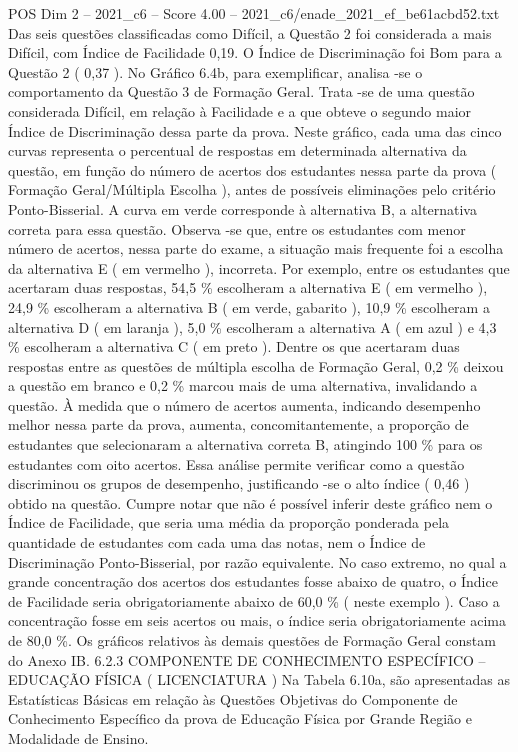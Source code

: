 \begin{textsample}{POS Dim 2 – 2021\_c6 – Score 4.00 – 2021\_c6/enade\_2021\_ef\_be61acbd52.txt}
Das seis questões classificadas como Difícil, a Questão 2 foi considerada a mais Difícil, com Índice de Facilidade 0,19.
O Índice de Discriminação foi Bom para a Questão 2 ( 0,37 ).
No Gráfico 6.4b, para exemplificar, analisa -se o comportamento da Questão 3 de Formação Geral.
Trata -se de uma questão considerada Difícil, em relação à Facilidade e a que obteve o segundo maior Índice de Discriminação dessa parte da prova.
Neste gráfico, cada uma das cinco curvas representa o percentual de respostas em determinada alternativa da questão, em função do número de acertos dos estudantes nessa parte da prova ( Formação Geral/Múltipla Escolha ), antes de possíveis eliminações pelo critério Ponto-Bisserial.
A curva em verde corresponde à alternativa B, a alternativa correta para essa questão.
Observa -se que, entre os estudantes com menor número de acertos, nessa parte do exame, a situação mais frequente foi a escolha da alternativa E ( em vermelho ), incorreta.
Por exemplo, entre os estudantes que acertaram duas respostas, 54,5 \% escolheram a alternativa E ( em vermelho ), 24,9 \% escolheram a alternativa B ( em verde, gabarito ), 10,9 \% escolheram a alternativa D ( em laranja ), 5,0 \% escolheram a alternativa A ( em azul ) e 4,3 \% escolheram a alternativa C ( em preto ).
Dentre os que acertaram duas respostas entre as questões de múltipla escolha de Formação Geral, 0,2 \% deixou a questão em branco e 0,2 \% marcou mais de uma alternativa, invalidando a questão.
À medida que o número de acertos aumenta, indicando desempenho melhor nessa parte da prova, aumenta, concomitantemente, a proporção de estudantes que selecionaram a alternativa correta B, atingindo 100 \% para os estudantes com oito acertos.
Essa análise permite verificar como a questão discriminou os grupos de desempenho, justificando -se o alto índice ( 0,46 ) obtido na questão.
Cumpre notar que não é possível inferir deste gráfico nem o Índice de Facilidade, que seria uma média da proporção ponderada pela quantidade de estudantes com cada uma das notas, nem o Índice de Discriminação Ponto-Bisserial, por razão equivalente.
No caso extremo, no qual a grande concentração dos acertos dos estudantes fosse abaixo de quatro, o Índice de Facilidade seria obrigatoriamente abaixo de 60,0 \% ( neste exemplo ).
Caso a concentração fosse em seis acertos ou mais, o índice seria obrigatoriamente acima de 80,0 \%.
Os gráficos relativos às demais questões de Formação Geral constam do Anexo IB. 6.2.3 COMPONENTE DE CONHECIMENTO ESPECÍFICO – EDUCAÇÃO FÍSICA ( LICENCIATURA ) Na Tabela 6.10a, são apresentadas as Estatísticas Básicas em relação às Questões Objetivas do Componente de Conhecimento Específico da prova de Educação Física por Grande Região e Modalidade de Ensino.

\end{textsample}
